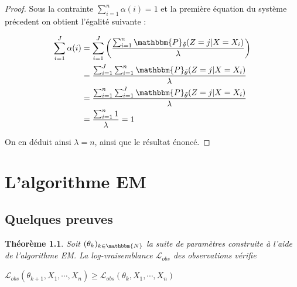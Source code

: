 \documentclass[frenchb]{report}
\newcommand{\N}{\mathbbm{N}}
\newcommand{\1}{\mathbbm{1}}
\newcommand{\prob}{\mathbbm{P}}
\newcommand{\lv}{\mathcal{L}}
\newcommand{\thetat}{\tilde{\theta}}
\newtheorem{thm}{Théorème}
\theoremstyle{definition}\newtheorem{defn}{Définition}
\theoremstyle{definition}\newtheorem{exm}{Exemple}
\theoremstyle{definition}\newtheorem{nota}{Notation}
\theoremstyle{definition}\newtheorem{rem}{Remarque}
\begin{document}
\begin{proof}
Sous la contrainte $\sum_{i=1}^n\alpha(i) =1$ et la première équation du système précedent on obtient l'égalité suivante : 

\begin{align*}
\sum_{i=1}^J\alpha(i) &= \sum_{i=1}^J \left(\frac{\sum_{i=1}^n \prob_{\thetat}(Z=j|X=X_i)}{\lambda}\right)\\
&=\frac{\sum_{i=1}^J \sum_{i=1}^n \prob_{\thetat}(Z=j|X=X_i)}{\lambda}\\
&=\frac{\sum_{i=1}^n \sum_{i=1}^J \prob_{\thetat}(Z=j|X=X_i)}{\lambda}\\
&=\frac{\sum_{i=1}^n 1}{\lambda}= 1\\
\end{align*}

On en déduit ainsi $\lambda = n$, ainsi que le résultat énoncé.

\end{proof}




\pagebreak

\chapter{L'algorithme EM}


\section{Quelques preuves}

\begin{thm}
Soit $(\theta_k)_{k\in \N}$ la suite de paramètres construite à l'aide de l'algorithme EM. La log-vraisemblance $\lv_{obs}$ des observations vérifie 
\begin{center} $\lv_{obs}(\theta_{k+1}, X_1, \cdots, X_n) \geq \lv_{obs}(\theta_k, X_1, \cdots, X_n)$ \end{center}
\end{thm}
\end{document}
